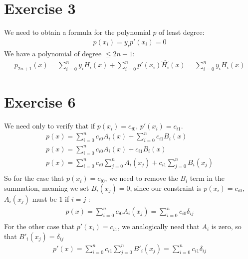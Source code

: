 \section{Exercise 3}
We need to obtain a formula for the polynomial $p$ of least degree:
\begin{gather*}
p(x_i) = y_i p'(x_i) = 0
\end{gather*}
We have a polynomial of degree $ \leq 2n+1$:
\begin{gather*}
p_{2n+1}(x)  = \sum_{i=0}^n y_i  H_i(x) + \sum_{i=0}^n p'(x_i)  \hat{H_i}(x) = \sum_{i=0}^n y_i H_i(x) 
\end{gather*}

\section{Exercise 6}
We need only to verify that if $ p(x_i) = c_{i0} $, $p'(x_i) = c_{i1}$.
\begin{gather*}
p(x) = \sum_{i= 0}^n c_{i0} A_i(x) + \sum_{i=0}^n c_{i1} B_i(x) \\
p(x) = \sum_{i= 0}^n c_{i0} A_i(x) + c_{i1} B_i(x) \\
p(x) = \sum_{i=0 }^n c_{i0} \sum_{j=0}^n A_i(x_j) + c_{i1} \sum_{j=0}^n B_i(x_j) \\
\end{gather*}
So for the case that $p(x_i) = c_{i0}$, we need to remove the $B_i$ term in the summation, meaning we set $B_i(x_j) = 0$, since our constraint is $p(x_i) = c_{i0}$, $A_i(x_j)$ must be $1$ if $i = j$ :
\begin{gather*}
p(x) = \sum_{i=0 }^n c_{i0}A_i(x_j) = \sum_{i=0 }^n c_{i0} \delta_{ij} \\
\end{gather*}
For the other case that $p'(x_i) = c_{i1}$, we analogically need that $A_i$ is zero, so that $B'_i(x_j) = \delta_{ij}$
\begin{gather*}
p'(x) = \sum_{i=0 }^n c_{i1} \sum_{j=0}^n B'_i(x_j) = \sum_{i=0 }^n c_{i1}\delta_{ij}
\end{gather*}